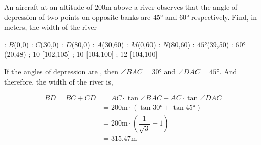 

\question[2] An aircraft at an altitude of $200$m above a river observes that the angle 
of depression of two points on opposite banks are $\ang{45}$ and $\ang{60}$ respectively.
Find, in meters, the width of the river


\ifprintanswers
  \begin{marginfigure}
      : $B$(0,0)
      : $C$(30,0)
      : $D$(80,0)
      : $A$(30,60)
      : $M$(0,60)
      : $N$(80,60)
      : $\ang{45}$(39,50) %
      : $\ang{60}$(20,48)
    \figdrawbegin{}
      \figdrawline [100,103,102,101,100]
      \figdrawline [103,101]
      \figdrawline [104,105]
       ; 10 [102,105] 
       ; 10 [104,100] 
       ; 12 [104,100] 
    \figdrawend
    \centerline{\box\figBoxA}
  \end{marginfigure}
\fi 

\begin{solution}[\halfpage]
  If the angles of depression are \asif, then $\angle{BAC} = \ang{30}$ and $\angle{DAC} = \ang{45}$.
  And therefore, the width of the river is, 
  
  \begin{align}
  	BD = BC + CD &= AC\cdot\tan\angle{BAC} + AC\cdot\tan\angle{DAC} \\
  	  &= \text{200m}\cdot\left( \tan\ang{30} + \tan\ang{45} \right) \\
  	  &= \text{200m}\cdot\left( \dfrac{1}{\sqrt{3}} + 1\right) \\
  	  &= 315.47\text{m}
  \end{align}
\end{solution}
